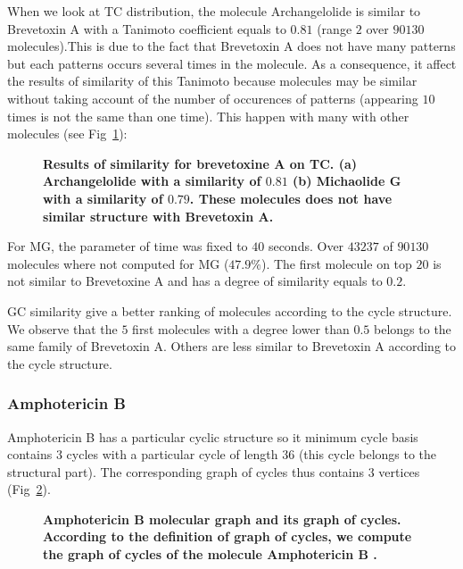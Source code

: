 \documentclass[10pt,letterpaper]{article}
\begin{document}
 
 When we look at TC distribution, the molecule Archangelolide is similar to Brevetoxin A with a Tanimoto coefficient equals to $0.81$ (range $2$ over $90130$ molecules).This is due to the fact that Brevetoxin A does not have many patterns but each patterns occurs several times in the molecule. As a consequence, it affect the results of similarity of this Tanimoto because molecules may be similar without taking account of the number of occurences of patterns (appearing $10$ times is not the same than one time). This happen with many with other molecules (see Fig~\ref{fig11}):
 
\begin{figure}[!h]
	\caption{\bf{Results of similarity for brevetoxine A on TC.}
	(a) Archangelolide with a similarity of $0.81$ (b) Michaolide G with a similarity of $0.79$. These molecules does not have similar structure with Brevetoxin A. }
	\label{fig11}
\end{figure}


For MG, the parameter of time was fixed to $40$ seconds. Over $43 237$ of $90 130$ molecules where not computed for MG ($47.9 \%$). The first molecule on top $20$ is not similar to Brevetoxine A and has a degree of similarity equals to $0.2$. 

GC similarity give a better ranking of molecules according to the cycle structure. We observe that the $5$ first molecules with a degree lower than $0.5$ belongs to the same family of Brevetoxin A. Others are less similar to Brevetoxin A according to the cycle structure.


\subsubsection*{Amphotericin B}
 
 Amphotericin B has a particular cyclic structure so it minimum cycle basis contains $3$ cycles with a particular cycle of length $36$ (this cycle belongs to the structural part). The corresponding graph of cycles thus contains $3$ vertices  (Fig~\ref{fig12}).
 
\begin{figure}[!h]
	\caption{\bf{Amphotericin B molecular graph and its graph of cycles.}
	According to the definition of graph of cycles, we compute the graph of cycles of the molecule Amphotericin B .}	
	\label{fig12}
\end{figure}
\end{document}
